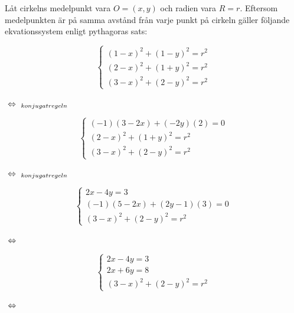 \documentclass{article}
\begin{document}
Låt cirkelns medelpunkt vara $O=(x, y)$ och radien vara $R=r$. Eftersom medelpunkten är på samma avstånd från varje punkt på cirkeln gäller följande ekvationssystem enligt pythagoras sats: 

\begin{equation*}
    \begin{cases}
        (1-x)^2+(1-y)^2=r^2 \\
        (2-x)^2+(1+y)^2=r^2 \\
        (3-x)^2+(2-y)^2=r^2
    \end{cases}
\end{equation*}

\vskip 0.1cm

$\ \Leftrightarrow \ _{konjugatregeln}$

\vskip 0.1cm

\begin{equation*}
    \begin{cases}
        (-1)(3-2x)+(-2y)(2)=0 \\
        (2-x)^2+(1+y)^2=r^2 \\
        (3-x)^2+(2-y)^2=r^2
    \end{cases}
\end{equation*}

\vskip 0.1cm

$\ \Leftrightarrow \ _{konjugatregeln}$

\vskip 0.1cm

\begin{equation*}
    \begin{cases}
        2x-4y=3 \\
        (-1)(5-2x)+(2y-1)(3)=0 \\
        (3-x)^2+(2-y)^2=r^2
    \end{cases}
\end{equation*}

\vskip 0.1cm

$\ \Leftrightarrow \ $

\vskip 0.1cm

\begin{equation*}
    \begin{cases}
        2x-4y=3 \\
        2x+6y=8 \\
        (3-x)^2+(2-y)^2=r^2
    \end{cases}
\end{equation*}

\vskip 0.1cm

$\ \Leftrightarrow \ $

\vskip 0.1cm
\end{document}
